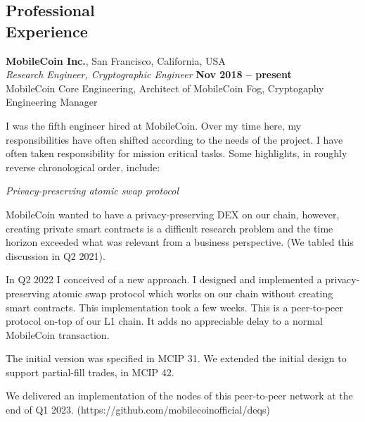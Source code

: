 \documentclass[margin,line]{resume}
\begin{document}
\begin{resume}
    \section{\mysidestyle Professional\\Experience}

    \textbf{MobileCoin Inc.}, San Francisco, California, USA \vspace{2mm}\\\vspace{1mm}%
    \textsl{Research Engineer, Cryptographic Engineer} \hfill \textbf{Nov 2018 -- present}\\
    MobileCoin Core Engineering, Architect of MobileCoin Fog, Cryptogaphy Engineering Manager

    I was the fifth engineer hired at MobileCoin. Over my time here, my responsibilities have often shifted according to the needs of the project.
    I have often taken responsibility for mission critical tasks.
    Some highlights, in roughly reverse chronological order, include:

    \textsl{Privacy-preserving atomic swap protocol}
    \begin{list2}
    \item{MobileCoin wanted to have a privacy-preserving DEX on our chain, however, creating private smart contracts
    is a difficult research problem and the time horizon exceeded what was relevant from a business perspective. (We tabled this discussion in Q2 2021).}
    \item{In Q2 2022 I conceived of a new approach. I designed and implemented a privacy-preserving atomic swap protocol which works on our chain without creating
    smart contracts. This implementation took a few weeks. This is a peer-to-peer protocol on-top of our L1 chain. It adds no appreciable delay to a normal MobileCoin transaction.}
    \item{The initial version was specified in MCIP 31. We extended the initial design to support partial-fill trades, in MCIP 42.}
    \item{We delivered an implementation of the nodes of this peer-to-peer network at the end of Q1 2023. (https://github.com/mobilecoinofficial/deqs)}
    \end{list2}

\newpage


\end{resume}
\end{document}

